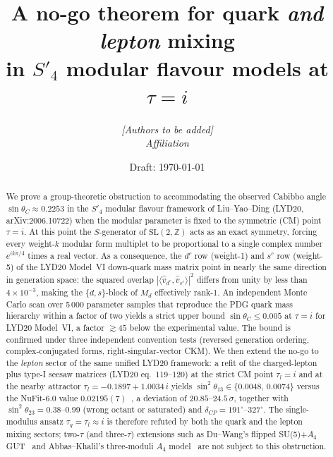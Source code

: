 \documentclass[a4paper,11pt]{article}
\title{A no-go theorem for quark \emph{and lepton} mixing\\
       in $S'_4$ modular flavour models at $\tau=i$}
\author{%
  \textit{[Authors to be added]}%
  \\[2ex]
  \small\textit{Affiliation}
}
\date{Draft: \today}
\newcommand{\sinTC}{\sin\theta_C}
\newcommand{\Md}{M_d}
\begin{document}
\maketitle

\begin{abstract}
We prove a group-theoretic obstruction to accommodating the observed
Cabibbo angle $\sin\theta_C \approx 0.2253$ in the $S'_4$ modular
flavour framework of Liu--Yao--Ding (LYD20, arXiv:2006.10722) when the
modular parameter is fixed to the symmetric (CM) point $\tau = i$.
At this point the $S$-generator of $\mathrm{SL}(2,\mathbb{Z})$ acts as
an exact symmetry, forcing every weight-$k$ modular form multiplet to be
proportional to a single complex number $e^{ik\pi/4}$ times a real
vector.  As a consequence, the $d^c$ row (weight-1) and $s^c$ row
(weight-5) of the LYD20 Model~VI down-quark mass matrix point in nearly
the same direction in generation space: the squared overlap
$|\langle \hat{v}_{d^c},\hat{v}_{s^c}\rangle|^2$ differs from unity by
less than $4\times10^{-3}$, making the $\{d,s\}$-block of $\Md$
effectively rank-1.  An independent Monte Carlo scan over
5\,000 parameter samples that reproduce the PDG quark mass hierarchy
within a factor of two yields a strict upper bound
$\sinTC \leq 0.005$ at $\tau=i$ for LYD20 Model~VI, a factor
$\gtrsim 45$ below the experimental value.  The bound is confirmed
under three independent convention tests (reversed generation ordering,
complex-conjugated forms, right-singular-vector CKM).
We then extend the no-go to the \emph{lepton} sector of the same
unified LYD20 framework: a refit of the charged-lepton plus type-I
seesaw matrices (LYD20 eq.~119--120) at the strict CM point
$\tau_l=i$ and at the nearby attractor
$\tau_l = -0.1897 + 1.0034\,i$ yields
$\sin^2\theta_{13} \in \{0.0048,\,0.0074\}$ versus the NuFit-6.0
value $0.02195(7)$~\cite{NuFit60}, a deviation of $20.85$--$24.5$\,$\sigma$,
together with $\sin^2\theta_{23}=0.38$--$0.99$ (wrong octant or
saturated) and $\delta_{CP}=191^\circ$--$327^\circ$.
The single-modulus ansatz $\tau_q=\tau_l\approx i$ is therefore
refuted by both the quark and the lepton mixing sectors;
two-$\tau$ (and three-$\tau$) extensions such as Du--Wang's flipped
SU(5)+$A_4$ GUT~\cite{DuWang22} and Abbas--Khalil's three-moduli
$A_4$ model~\cite{AbbasKhalil22} are not subject to this
obstruction.
\end{abstract}

\end{document}

